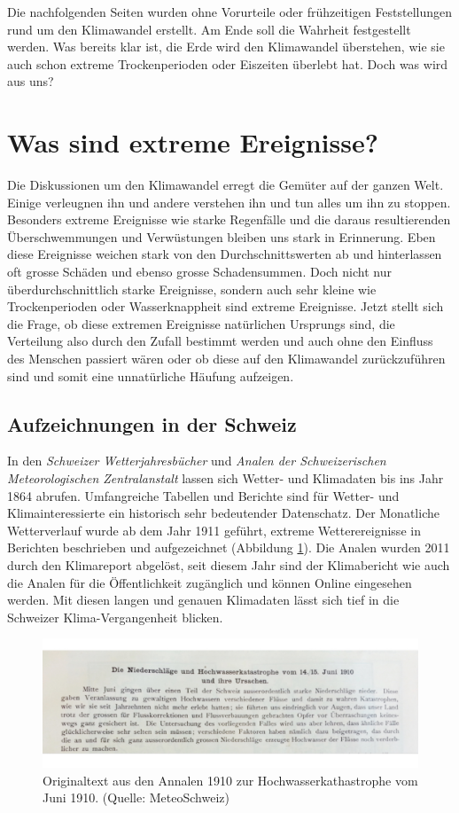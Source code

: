 \begin{refsection}
Die nachfolgenden Seiten wurden ohne Vorurteile oder frühzeitigen Feststellungen rund um den Klimawandel erstellt. Am Ende soll die Wahrheit festgestellt werden.
Was bereits klar ist, die Erde wird den Klimawandel überstehen, wie sie auch schon extreme Trockenperioden oder Eiszeiten überlebt hat. Doch was wird aus uns?


\section{Was sind extreme Ereignisse?}
Die Diskussionen um den Klimawandel erregt die Gemüter auf der ganzen Welt. Einige verleugnen ihn und andere verstehen ihn und tun alles um ihn zu stoppen. Besonders extreme Ereignisse wie starke Regenfälle und die daraus resultierenden Überschwemmungen und Verwüstungen bleiben uns stark in Erinnerung.
Eben diese Ereignisse weichen stark von den Durchschnittswerten ab und hinterlassen oft grosse Schäden und ebenso grosse Schadensummen. Doch nicht nur überdurchschnittlich starke Ereignisse, sondern auch sehr kleine wie Trockenperioden oder Wasserknappheit sind extreme Ereignisse.
Jetzt stellt sich die Frage, ob diese extremen Ereignisse natürlichen Ursprungs sind, die Verteilung also durch den Zufall bestimmt werden und auch ohne den Einfluss des Menschen passiert wären oder ob diese auf den Klimawandel zurückzuführen sind und somit eine unnatürliche Häufung aufzeigen.


\subsection{Aufzeichnungen in der Schweiz}
In den \textit{Schweizer Wetterjahresbücher} und \textit{Analen der Schweizerischen Meteorologischen Zentralanstalt} lassen sich Wetter- und Klimadaten bis ins Jahr 1864 abrufen. Umfangreiche Tabellen und Berichte sind für Wetter- und Klimainteressierte ein historisch sehr bedeutender Datenschatz. 
Der Monatliche Wetterverlauf wurde ab dem Jahr 1911 geführt, extreme Wetterereignisse in Berichten beschrieben und aufgezeichnet (Abbildung \ref{Analen}). Die Analen wurden 2011 durch den Klimareport abgelöst, seit diesem Jahr sind der Klimabericht wie auch die Analen für die Öffentlichkeit zugänglich und können Online eingesehen werden.
Mit diesen langen und genauen Klimadaten lässt sich tief in die Schweizer Klima-Vergangenheit blicken.

\begin{figure}
\centering
\includegraphics[width=\hsize]{extrem/Analen.jpg}
\caption{Originaltext aus den Annalen 1910 zur Hochwasserkathastrophe vom Juni 1910. (Quelle: MeteoSchweiz)}
\label{Analen}
\end{figure}



\end{refsection}
